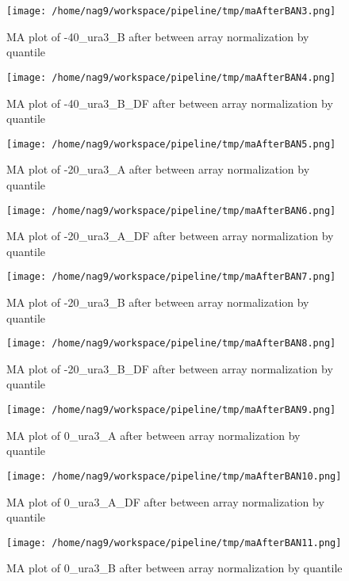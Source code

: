 \documentclass[titlepage]{article}
\begin{document}
\begin{figure}[htb!]
\centering
\texttt{[image: /home/nag9/workspace/pipeline/tmp/maAfterBAN3.png]}
\caption{MA plot of -40\_ura3\_B after between array normalization by quantile}
\end{figure}\pagebreak
\begin{figure}[htb!]
\centering
\texttt{[image: /home/nag9/workspace/pipeline/tmp/maAfterBAN4.png]}
\caption{MA plot of -40\_ura3\_B\_DF after between array normalization by quantile}
\end{figure}\pagebreak
\begin{figure}[htb!]
\centering
\texttt{[image: /home/nag9/workspace/pipeline/tmp/maAfterBAN5.png]}
\caption{MA plot of -20\_ura3\_A after between array normalization by quantile}
\end{figure}\pagebreak
\begin{figure}[htb!]
\centering
\texttt{[image: /home/nag9/workspace/pipeline/tmp/maAfterBAN6.png]}
\caption{MA plot of -20\_ura3\_A\_DF after between array normalization by quantile}
\end{figure}\pagebreak
\begin{figure}[htb!]
\centering
\texttt{[image: /home/nag9/workspace/pipeline/tmp/maAfterBAN7.png]}
\caption{MA plot of -20\_ura3\_B after between array normalization by quantile}
\end{figure}\pagebreak
\begin{figure}[htb!]
\centering
\texttt{[image: /home/nag9/workspace/pipeline/tmp/maAfterBAN8.png]}
\caption{MA plot of -20\_ura3\_B\_DF after between array normalization by quantile}
\end{figure}\pagebreak
\begin{figure}[htb!]
\centering
\texttt{[image: /home/nag9/workspace/pipeline/tmp/maAfterBAN9.png]}
\caption{MA plot of 0\_ura3\_A after between array normalization by quantile}
\end{figure}\pagebreak
\begin{figure}[htb!]
\centering
\texttt{[image: /home/nag9/workspace/pipeline/tmp/maAfterBAN10.png]}
\caption{MA plot of 0\_ura3\_A\_DF after between array normalization by quantile}
\end{figure}\pagebreak
\begin{figure}[htb!]
\centering
\texttt{[image: /home/nag9/workspace/pipeline/tmp/maAfterBAN11.png]}
\caption{MA plot of 0\_ura3\_B after between array normalization by quantile}
\end{figure}\pagebreak
\end{document}
